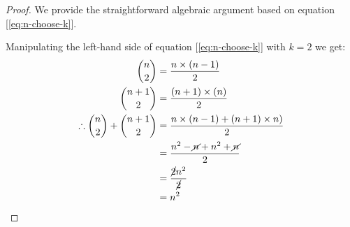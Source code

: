 \documentclass[11pt]{book}
\theoremstyle{definition}
\theoremstyle{plain}
\theoremstyle{definition}
\theoremstyle{problemstyle}
\theoremstyle{remark}
\theoremstyle{definition}
\begin{document}
\begin{proof}
    We provide the straightforward algebraic argument based on equation [\ref{eq:n-choose-k}].

    Manipulating the left-hand side of equation [\ref{eq:n-choose-k}] with $k=2$ we get:
    \begin{align*}
        \binom{n}{2}&=\frac{n\times(n-1)}{2}\\
        \binom{n+1}{2}&=\frac{(n+1)\times(n)}{2}\\
        \therefore\binom{n}{2}+\binom{n+1}{2}&=\frac{n\times(n-1)+(n+1)\times n)}{2}\\
                                             &=\frac{n^2-\cancel{n}+n^2+\cancel{n}}{2}\\
                                             &=\frac{\cancel{2}n^2}{\cancel{2}}\\
                                             &=n^2
    \end{align*}
\end{proof}
\end{document}
